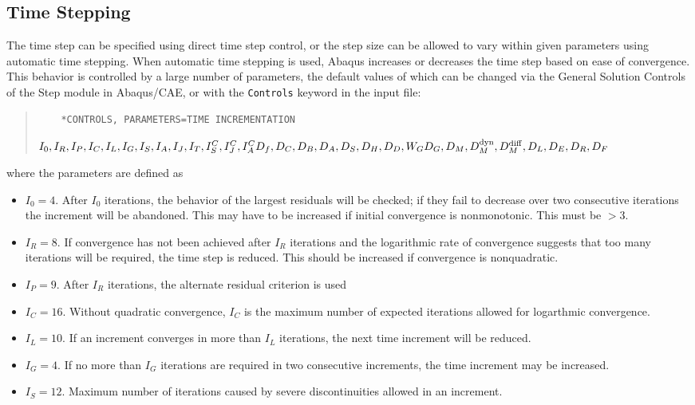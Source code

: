 \documentclass[10pt,letterpaper,oneside]{report}
\newcommand{\scas}[1]{\mbox{{\scriptsize{${\rm{#1}}$}}}{}}
\begin{document}
\begin{itemize}
\subsection{Time Stepping}
The time step can be specified using direct time step control, or the step size can be allowed to vary within given parameters using automatic time stepping.  When automatic time stepping is used, Abaqus increases or decreases the time step based on ease of convergence.  This behavior is controlled by a large number of parameters, the default values of which can be changed via the General Solution Controls of the Step module in Abaqus/CAE, or with the \texttt{Controls} keyword in the input file:
\begin{quote} 
    \begin{lstlisting}
    *CONTROLS, PARAMETERS=TIME INCREMENTATION
    \end{lstlisting} 
    $I_0, I_R, I_P, I_C, I_L, I_G, I_S, I_A, I_J, I_T, I^C_S, I^C_J, I^C_A \\
    D_f, D_C, D_B, D_A, D_S, D_H, D_D, W_G \\
    D_G, D_M, D_M^{\scas{dyn}}, D_M^{\scas{diff}}, D_L, D_E, D_R, D_F$
\end{quote}
where the parameters are defined as 
\begin{itemize}
\item $I_0 = 4$.  After $I_0$ iterations, the behavior of the largest residuals will be checked; if they fail to decrease over two consecutive iterations the increment will be abandoned.  This may have to be increased if initial convergence is nonmonotonic.  This must be $> 3$.
\item $I_R = 8$.  If convergence has not been achieved after $I_R$ iterations and the logarithmic rate of convergence suggests that too many iterations will be required, the time step is reduced.  This should be increased if convergence is nonquadratic.  
\item $I_P = 9$.  After $I_R$ iterations, the alternate residual criterion is used
\item $I_C = 16$.  Without quadratic convergence, $I_C$ is the maximum number of expected iterations allowed for logarthmic convergence.
\item $I_L = 10$.  If an increment converges in more than $I_L$ iterations, the next time increment will be reduced. 
\item $I_G = 4$.  If no more than $I_G$ iterations are required in two consecutive increments, the time increment may be increased.
\item $I_S = 12$.  Maximum number of iterations caused by severe discontinuities allowed in an increment.

\end{itemize}
\end{itemize}
\end{document}
